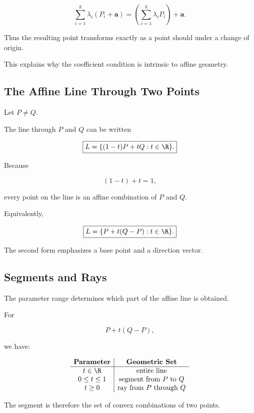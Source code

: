 \[
\sum_{i=1}^{k}\lambda_i(P_i+\mathbf{a})
=
\left(\sum_{i=1}^{k}\lambda_iP_i\right)+\mathbf{a}.
\]

Thus the resulting point transforms exactly as a point should under a change
of origin.

This explains why the coefficient condition is intrinsic to affine
geometry.

\subsection{The Affine Line Through Two Points}
\label{subsec:affine-line-two-points}

Let \(P\neq Q\).

The line through \(P\) and \(Q\) can be written

\[ \boxed{L=\{(1-t)P+tQ:t\in\R\}.} \]

Because

\[ (1-t)+t=1, \]

every point on the line is an affine combination of \(P\) and \(Q\).

Equivalently,

\[ \boxed{L=\{P+t(Q-P):t\in\R\}.} \]

The second form emphasizes a base point and a direction vector.

\subsection{Segments and Rays}
\label{subsec:affine-segments-rays}

The parameter range determines which part of the affine line is obtained.

For

\[ P+t(Q-P), \]

we have:

\[
\begin{array}{c|c}
\textbf{Parameter} & \textbf{Geometric Set}\\
\hline
t\in\R & \text{entire line}\\
0\leq t\leq1 & \text{segment from \(P\) to \(Q\)}\\
t\geq0 & \text{ray from \(P\) through \(Q\)}
\end{array}
\]

The segment is therefore the set of convex combinations of two points.


